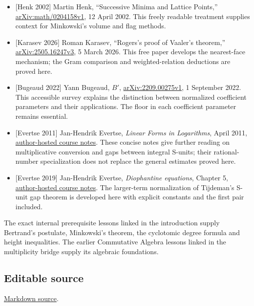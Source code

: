 \documentclass[
  11pt,
  a4paper,
]{article}
\begin{document}
\begin{itemize}
{  journal text}. The least-common-multiple proof uses Hanson's
  Sylvester-factorial mechanism, with a separately supplied entropy
  estimate and finite prefix check.
\item
  {[}Henk 2002{]} Martin Henk, ``Successive Minima and Lattice Points,''
  \href{https://arxiv.org/abs/math/0204158v1}{arXiv:math/0204158v1}, 12
  April 2002. This freely readable treatment supplies context for
  Minkowski's volume and flag methods.
\item
  {[}Karasev 2026{]} Roman Karasev, ``Rogers's proof of Vaaler's
  theorem,''
  \href{https://arxiv.org/abs/2505.16247v3}{arXiv:2505.16247v3}, 5 March
  2026. This free paper develops the nearest-face mechanism; the Gram
  comparison and weighted-relation deductions are proved here.
\item
  {[}Bugeaud 2022{]} Yann Bugeaud, \emph{\(B'\)},
  \href{https://arxiv.org/abs/2209.00275v1}{arXiv:2209.00275v1}, 1
  September 2022. This accessible survey explains the distinction
  between normalized coefficient parameters and their applications. The
  floor in each coefficient parameter remains essential.
\item
  {[}Evertse 2011{]} Jan-Hendrik Evertse, \emph{Linear Forms in
  Logarithms}, April 2011,
  \href{https://pub.math.leidenuniv.nl/~evertsejh/dio2011-linforms.pdf}{author-hosted
  course notes}. These concise notes give further reading on
  multiplicative conversion and gaps between integral S-units; their
  rational-number specialization does not replace the general estimates
  proved here.
\item
  {[}Evertse 2019{]} Jan-Hendrik Evertse, \emph{Diophantine equations},
  Chapter 5,
  \href{https://pub.math.leidenuniv.nl/~evertsejh/dio19-5.pdf}{author-hosted
  course notes}. The larger-term normalization of Tijdeman's S-unit gap
  theorem is developed here with explicit constants and the first pair
  included.
\end{itemize}

The exact internal prerequisite lessons linked in the introduction
supply Bertrand's postulate, Minkowski's theorem, the cyclotomic degree
formula and height inequalities. The earlier Commutative Algebra lessons
linked in the multiplicity bridge supply its algebraic foundations.

\subsection{Editable source}\label{editable-source}

\href{https://kokunoyumeto.github.io/open-math-courses-public/courses/TR-BAKER/src/TR-BAKER-08.md}{Markdown source}.
\end{document}
